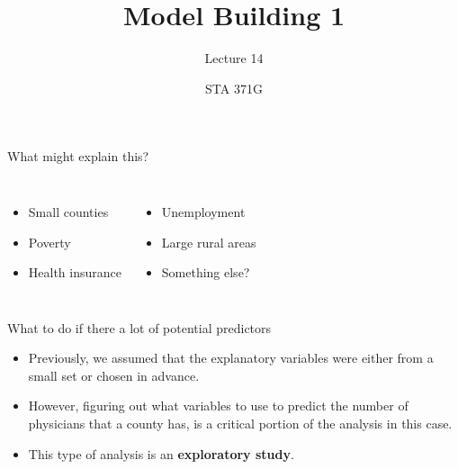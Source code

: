 \documentclass{beamer}\usepackage[]{graphicx}\usepackage[]{color}
\title{Model Building 1}
\subtitle{Lecture 14}
\author{STA 371G}
\begin{document}
  
  

  \frame{\maketitle}



  \begin{darkframes}    
    \begin{frame}
    \end{frame}

    \begin{frame}{What might explain this?}
      \begin{columns}[onlytextwidth]
          \begin{itemize}
            \item Small counties
            \item Poverty
            \item Health insurance
          \end{itemize}
          \begin{itemize}
            \item Unemployment
            \item Large rural areas
            \item Something else?
          \end{itemize}
      \end{columns}
      
      \lc %
    \end{frame}

    \begin{frame}[fragile]{What to do if there a lot of potential predictors}
      \begin{itemize}[<+->]
        \item Previously, we assumed that the explanatory variables were either from a small set or chosen in advance.
        \item However, figuring out what variables to use to predict the number of physicians that a county has, is a critical portion of the analysis in this case.
        \item This type of analysis is an \textbf{exploratory study}.
      \end{itemize} 
    \end{frame}


\end{darkframes}
\end{document}

